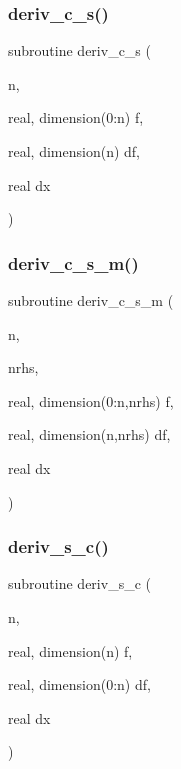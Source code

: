 \mbox{\label{ders__n_8f_ac8fae2c25978db11f5a3504bf29b8757}} 
\subsubsection{\texorpdfstring{deriv\+\_\+c\+\_\+s()}{deriv\_c\_s()}}
{\footnotesize\ttfamily subroutine deriv\+\_\+c\+\_\+s (\begin{DoxyParamCaption}\item[{}]{n,  }\item[{real, dimension(0\+:n)}]{f,  }\item[{real, dimension(n)}]{df,  }\item[{real}]{dx }\end{DoxyParamCaption})}

\mbox{\label{ders__n_8f_a193158e4b0763802315cc3ec6c85b58b}} 
\subsubsection{\texorpdfstring{deriv\+\_\+c\+\_\+s\+\_\+m()}{deriv\_c\_s\_m()}}
{\footnotesize\ttfamily subroutine deriv\+\_\+c\+\_\+s\+\_\+m (\begin{DoxyParamCaption}\item[{}]{n,  }\item[{}]{nrhs,  }\item[{real, dimension(0\+:n,nrhs)}]{f,  }\item[{real, dimension(n,nrhs)}]{df,  }\item[{real}]{dx }\end{DoxyParamCaption})}

\mbox{\label{ders__n_8f_a03bb68342c381937ad1ffc828a0f3b2e}} 
\subsubsection{\texorpdfstring{deriv\+\_\+s\+\_\+c()}{deriv\_s\_c()}}
{\footnotesize\ttfamily subroutine deriv\+\_\+s\+\_\+c (\begin{DoxyParamCaption}\item[{}]{n,  }\item[{real, dimension(n)}]{f,  }\item[{real, dimension(0\+:n)}]{df,  }\item[{real}]{dx }\end{DoxyParamCaption})}

